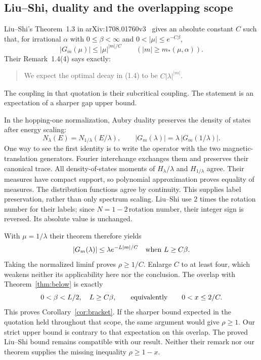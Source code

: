 \subsection{Liu--Shi, duality and the overlapping scope}\label{sec:below-literature}
Liu--Shi's Theorem~1.3 in arXiv:1708.01760v3~\cite{LiuShi2019} gives an absolute constant $C$ such that, for irrational $\alpha$ with $0\le\beta<\infty$ and $0<|\mu|\le e^{-C\beta}$,
\[
 |G_m(\mu)|\le|\mu|^{|m|/C}\qquad(|m|\ge m_*(\mu,\alpha)).
\]
Their Remark~1.4(4) says exactly:
\begin{quote}
We expect the optimal decay in (1.4) to be $C|\lambda|^{|m|}$.
\end{quote}
The coupling in that quotation is their subcritical coupling. The statement is an expectation of a sharper gap upper bound.

In the hopping-one normalization, Aubry duality preserves the density of states after energy scaling:
\begin{equation}\label{eq:belowduality}
 N_\lambda(E)=N_{1/\lambda}(E/\lambda),\qquad
 |G_m(\lambda)|=\lambda\,|G_m(1/\lambda)|.
\end{equation}
One way to see the first identity is to write the operator with the two magnetic-translation generators. Fourier interchange exchanges them and preserves their canonical trace. All density-of-states moments of $H_\lambda/\lambda$ and $H_{1/\lambda}$ agree. Their measures have compact support, so polynomial approximation proves equality of measures. The distribution functions agree by continuity. This supplies label preservation, rather than only spectrum scaling. Liu--Shi use $2$ times the rotation number for their labels; since $N=1-2\,\text{rotation number}$, their integer sign is reversed. Its absolute value is unchanged.

With $\mu=1/\lambda$ their theorem therefore yields
\[
 |G_m(\lambda)|\le\lambda e^{-L|m|/C}
 \quad\hbox{when }L\ge C\beta.
\]
Taking the normalized liminf proves $\rho\ge1/C$. Enlarge $C$ to at least four, which weakens neither its applicability here nor the conclusion. The overlap with Theorem~\ref{thm:below} is exactly
\[
 0<\beta<L/2,\quad L\ge C\beta,
 \qquad\hbox{equivalently}\qquad 0<x\le2/C.
\]
This proves Corollary~\ref{cor:bracket}. If the sharper bound expected in the quotation held throughout that scope, the same argument would give $\rho\ge1$. Our strict upper bound is contrary to that expectation on this overlap. The proved Liu--Shi bound remains compatible with our result. Neither their remark nor our theorem supplies the missing inequality $\rho\ge1-x$.
\label{end:below}
